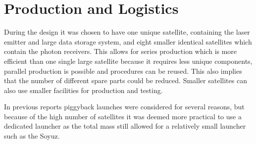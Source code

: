 \section{Production and Logistics}
\label{SSPRO}

During the design it was chosen to have one unique satellite, containing the laser emitter and large data storage system, and eight smaller identical satellites which contain the photon receivers. This allows for series production which is more efficient than one single large satellite because it requires less unique components, parallel production is possible and procedures can be reused. This also implies that the number of different spare parts could be reduced. Smaller satellites can also use smaller facilities for production and testing. 

In previous reports piggyback launches were considered for several reasons, but because of the high number of satellites it was deemed more practical to use a dedicated launcher as the total mass still allowed for a relatively small launcher such as the Soyuz.
